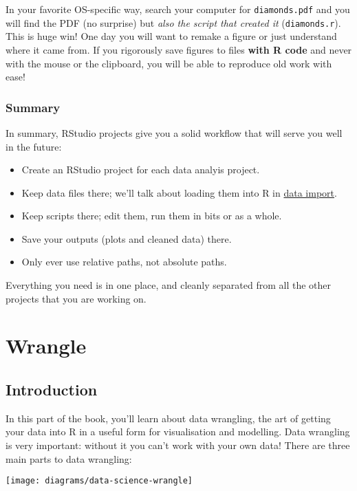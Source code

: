 \documentclass[]{book}
\begin{document}
In your favorite OS-specific way, search your computer for
\texttt{diamonds.pdf} and you will find the PDF (no surprise) but
\emph{also the script that created it} (\texttt{diamonds.r}). This is
huge win! One day you will want to remake a figure or just understand
where it came from. If you rigorously save figures to files \textbf{with
R code} and never with the mouse or the clipboard, you will be able to
reproduce old work with ease!

\section{Summary}\label{summary}

In summary, RStudio projects give you a solid workflow that will serve
you well in the future:

\begin{itemize}
\item
  Create an RStudio project for each data analyis project.
\item
  Keep data files there; we'll talk about loading them into R in
  \protect\hyperlink{data-import}{data import}.
\item
  Keep scripts there; edit them, run them in bits or as a whole.
\item
  Save your outputs (plots and cleaned data) there.
\item
  Only ever use relative paths, not absolute paths.
\end{itemize}

Everything you need is in one place, and cleanly separated from all the
other projects that you are working on.

\part{Wrangle}\label{part-wrangle}


\hypertarget{wrangle-intro}{\chapter{Introduction}\label{wrangle-intro}}

In this part of the book, you'll learn about data wrangling, the art of
getting your data into R in a useful form for visualisation and
modelling. Data wrangling is very important: without it you can't work
with your own data! There are three main parts to data wrangling:

\begin{center}\texttt{[image: diagrams/data-science-wrangle]} \end{center}
\end{document}
